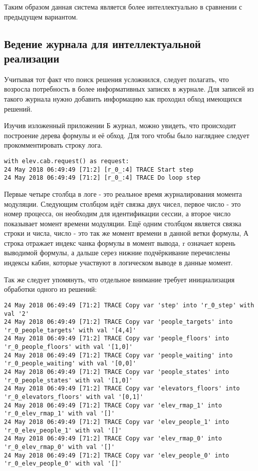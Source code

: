 	Таким образом данная система является более интеллектуально в сравнении с предыдущем вариантом.

	\subsection{Ведение журнала для интеллектуальной реализации}
		Учитывая тот факт что поиск решения усложнился, следует полагать, что возросла потребность
			в более информативных записях в журнале. Для записей из такого журнала
			нужно добавить информацию как проходил обход имеющихся решений.

		Изучив изложенный приложении Б журнал, можно увидеть, что происходит построение дерева формулы и её обход.
			Для того чтобы было нагляднее следует прокомментировать строку лога.

\begin{lstlisting}
with elev.cab.request() as request:
24 May 2018 06:49:49 [71:2] [r_0_:4] TRACE Start step
24 May 2018 06:49:49 [71:2] [r_0_:4] TRACE Do loop step
\end{lstlisting}

		Первые четыре столбца в логе - это реальное время журналирования момента модуляции.
			Следующим столбцом идёт связка двух чисел, первое число - это номер процесса,
			он необходим для идентификации сессии, а второе число показывает момент времени модуляции.
			Ещё одним столбцом является связка строки и числа, число - это так же момент времени в данной ветки формулы,
			А строка отражает индекс чанка формулы в момент вывода, r означает корень выводимой формулы,
			а дальше серез нижние подчёркивание перечислены индексы кабин, которые участвуют
			в логическом выводе в данные момент.

		Так же следует упомянуть, что отдельное внимание требует инициализация обработки одного из решений:

\begin{lstlisting}
24 May 2018 06:49:49 [71:2] TRACE Copy var 'step' into 'r_0_step' with val '2'
24 May 2018 06:49:49 [71:2] TRACE Copy var 'people_targets' into 'r_0_people_targets' with val '[4,4]'
24 May 2018 06:49:49 [71:2] TRACE Copy var 'people_floors' into 'r_0_people_floors' with val '[1,0]'
24 May 2018 06:49:49 [71:2] TRACE Copy var 'people_waiting' into 'r_0_people_waiting' with val '[0,0]'
24 May 2018 06:49:49 [71:2] TRACE Copy var 'people_states' into 'r_0_people_states' with val '[1,0]'
24 May 2018 06:49:49 [71:2] TRACE Copy var 'elevators_floors' into 'r_0_elevators_floors' with val '[0,1]'
24 May 2018 06:49:49 [71:2] TRACE Copy var 'elev_rmap_1' into 'r_0_elev_rmap_1' with val '[]'
24 May 2018 06:49:49 [71:2] TRACE Copy var 'elev_people_1' into 'r_0_elev_people_1' with val '[]'
24 May 2018 06:49:49 [71:2] TRACE Copy var 'elev_rmap_0' into 'r_0_elev_rmap_0' with val '[]'
24 May 2018 06:49:49 [71:2] TRACE Copy var 'elev_people_0' into 'r_0_elev_people_0' with val '[]'
\end{lstlisting}

